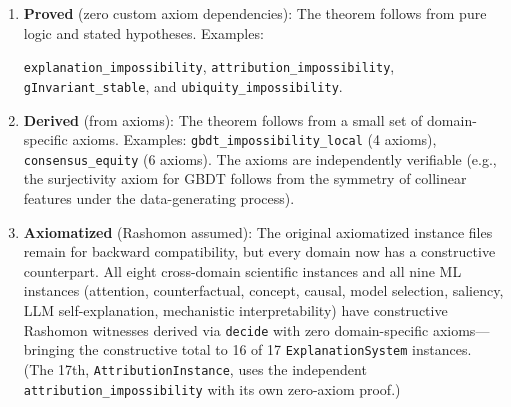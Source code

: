 \documentclass[11pt,a4paper]{article}
\begin{document}
\begin{enumerate}[label=(\alph*)]
  \item \textbf{Proved} (zero custom axiom dependencies): The theorem
    follows from pure logic and stated hypotheses.  Examples:
    {\raggedright\texttt{explanation\_impossibility},
    \texttt{attribution\_impossibility},
    \texttt{gInvariant\_stable}, and
    \texttt{ubiquity\_impossibility}.\par}

  \item \textbf{Derived} (from axioms): The theorem follows from a small set
    of domain-specific axioms.  Examples: \texttt{gbdt\_impossibility\_local}
    (4 axioms), \texttt{consensus\_equity} (6 axioms).  The axioms are
    independently verifiable (e.g., the surjectivity axiom for GBDT follows
    from the symmetry of collinear features under the data-generating process).

  \item \textbf{Axiomatized} (Rashomon assumed): The original axiomatized
    instance files remain for backward compatibility, but every domain now
    has a constructive counterpart.  All eight cross-domain scientific
    instances and all nine ML instances (attention, counterfactual, concept,
    causal, model selection, saliency, LLM self-explanation, mechanistic
    interpretability) have constructive Rashomon witnesses derived via
    \texttt{decide} with zero domain-specific axioms---bringing the
    constructive total to 16 of 17 \texttt{ExplanationSystem} instances.
    (The 17th, \texttt{AttributionInstance}, uses the independent
    \texttt{attribution\_impossibility} with its own zero-axiom proof.)


\end{enumerate}
\end{document}
